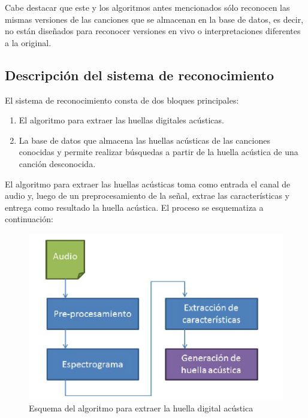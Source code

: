 \documentclass[10pt,spanish,a4paper,openany,notitlepage]{article}
\begin{document}
Cabe destacar que este y los algoritmos antes mencionados sólo reconocen las mismas
versiones de las canciones que se almacenan en la base de datos, es decir, no están
diseñados para reconocer versiones en vivo o interpretaciones diferentes a la original.

\subsection{Descripción del sistema de reconocimiento}

El sistema de reconocimiento consta de dos bloques principales:

\begin{enumerate}
\item El algoritmo para extraer las huellas digitales acústicas.
\item La base de datos que almacena las huellas acústicas de las canciones conocidas
y permite realizar búsquedas a partir de la huella acústica de una canción
desconocida.
\end{enumerate}

El algoritmo para extraer las huellas acústicas toma como entrada el canal de audio y,
luego de un preprocesamiento de la señal, extrae las características y entrega como
resultado la huella acústica. El proceso se esquematiza a continuación:

\begin{figure}[H] %
\begin{center}
\includegraphics[scale=0.8]{./imagenes/extraccion.png}
\caption{Esquema del algoritmo para extraer la huella digital acústica}
 \label{fig:extraccion}
\end{center}
\end{figure}
\end{document}
